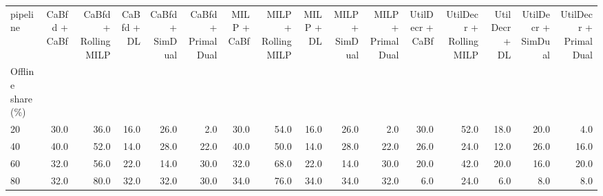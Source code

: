 \begin{tabular}{lrrrrrrrrrrrrrrr}
\toprule
pipeline & CaBfd + CaBf & CaBfd + RollingMILP & CaBfd + DL & CaBfd + SimDual & CaBfd + PrimalDual & MILP + CaBf & MILP + RollingMILP & MILP + DL & MILP + SimDual & MILP + PrimalDual & UtilDecr + CaBf & UtilDecr + RollingMILP & UtilDecr + DL & UtilDecr + SimDual & UtilDecr + PrimalDual \\
Offline share (\%) &  &  &  &  &  &  &  &  &  &  &  &  &  &  &  \\
\midrule
20 & 30.0 & 36.0 & 16.0 & 26.0 & 2.0 & 30.0 & 54.0 & 16.0 & 26.0 & 2.0 & 30.0 & 52.0 & 18.0 & 20.0 & 4.0 \\
40 & 40.0 & 52.0 & 14.0 & 28.0 & 22.0 & 40.0 & 50.0 & 14.0 & 28.0 & 22.0 & 26.0 & 24.0 & 12.0 & 26.0 & 16.0 \\
60 & 32.0 & 56.0 & 22.0 & 14.0 & 30.0 & 32.0 & 68.0 & 22.0 & 14.0 & 30.0 & 20.0 & 42.0 & 20.0 & 16.0 & 20.0 \\
80 & 32.0 & 80.0 & 32.0 & 32.0 & 30.0 & 34.0 & 76.0 & 34.0 & 34.0 & 32.0 & 6.0 & 24.0 & 6.0 & 8.0 & 8.0 \\
\bottomrule
\end{tabular}
